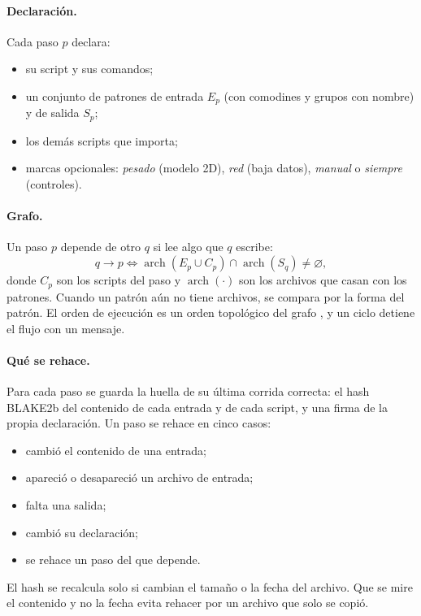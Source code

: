 \documentclass{sosg-informe}
\begin{document}
\paragraph{Declaración.} Cada paso $p$ declara:
\begin{itemize}
  \item su script y sus comandos;
  \item un conjunto de patrones de entrada $E_p$ (con comodines y grupos con nombre) y de salida $S_p$;
  \item los demás scripts que importa;
  \item marcas opcionales: \emph{pesado} (modelo 2D), \emph{red} (baja datos), \emph{manual} o \emph{siempre} (controles).
\end{itemize}

\paragraph{Grafo.} Un paso $p$ depende de otro $q$ si lee algo que $q$ escribe:
\begin{equation}\label{eq:dep}
  q \rightarrow p \iff \operatorname{arch}(E_p \cup C_p) \cap \operatorname{arch}(S_q) \neq \varnothing,
\end{equation}
donde $C_p$ son los scripts del paso y $\operatorname{arch}(\cdot)$ son los archivos que casan con los patrones. Cuando un patrón aún no tiene archivos, se compara por la forma del patrón. El orden de ejecución es un orden topológico del grafo \citep{kahn1962}, y un ciclo detiene el flujo con un mensaje.

\paragraph{Qué se rehace.} Para cada paso se guarda la huella de su última corrida correcta: el hash BLAKE2b del contenido de cada entrada y de cada script, y una firma de la propia declaración. Un paso se rehace en cinco casos:
\begin{itemize}
  \item cambió el contenido de una entrada;
  \item apareció o desapareció un archivo de entrada;
  \item falta una salida;
  \item cambió su declaración;
  \item se rehace un paso del que depende.
\end{itemize}
El hash se recalcula solo si cambian el tamaño o la fecha del archivo. Que se mire el contenido y no la fecha evita rehacer por un archivo que solo se copió.
\end{document}
